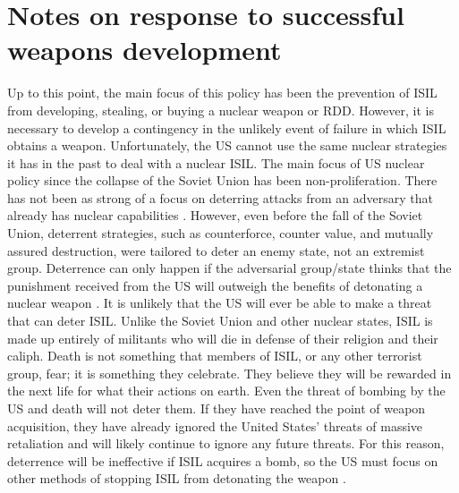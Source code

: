 \documentclass{report}
\begin{document}
\chapter{Notes on response to successful weapons development}

Up to this point, the main focus of this policy has been the prevention of ISIL from developing, stealing, or buying a nuclear weapon or RDD.  However, it is necessary to develop a contingency in the unlikely event of failure in which ISIL obtains a weapon.  Unfortunately, the US cannot use the same nuclear strategies it has in the past to deal with a nuclear ISIL.  The main focus of US nuclear policy since the collapse of the Soviet Union has been non-proliferation.  There has not been as strong of a focus on deterring attacks from an adversary that already has nuclear capabilities \cite{Bracken2013}. However, even before the fall of the Soviet Union, deterrent strategies, such as counterforce, counter value, and mutually assured destruction, were tailored to deter an enemy state, not an extremist group.  Deterrence can only happen if the adversarial group/state thinks that the punishment received from the US will outweigh the benefits of detonating a nuclear weapon \cite{kaplan1991wizards}.  It is unlikely that the US will ever be able to make a threat that can deter ISIL.  Unlike the Soviet Union and other nuclear states, ISIL is made up entirely of militants who will die in defense of their religion and their caliph.  Death is not something that members of ISIL, or any other terrorist group, fear; it is something they celebrate.  They believe they will be rewarded in the next life for what their actions on earth.  Even the threat of bombing by the US and death will not deter them.  If they have reached the point of weapon acquisition, they have already ignored the United States’ threats of massive retaliation and will likely continue to ignore any future threats.  For this reason, deterrence will be ineffective if ISIL acquires a bomb, so the US must focus on other methods of stopping ISIL from detonating the weapon \cite{Sanderson2015}.
\end{document}
